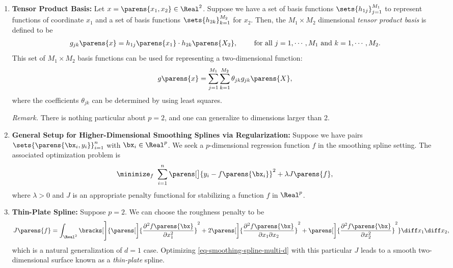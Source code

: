 \documentclass[12pt]{article}
\begin{document}
\begin{enumerate}[label=\textbf{\arabic*.}]

	\item \textbf{Tensor Product Basis:} Let $x = \parens{x_1, x_2} \in \Real^2$. Suppose we have a set of basis functions $\sets{h_{1j}}_{j = 1}^{M_1}$ to represent functions of coordinate $x_1$ and a set of basis functions $\sets{h_{2k}}_{k = 1}^{M_2}$ for $x_2$. Then, the $M_1 \times M_2$ dimensional \textit{tensor product basis} is defined to be 
	\begin{align*}
		g_{jk} \parens{x} = h_{1j} \parens{x_1} \cdot h_{2k} \parens{X_2}, \qquad \text{ for all } j = 1, \cdots, M_1 \text{ and } k = 1, \cdots, M_2. 
	\end{align*}
	This set of $M_1 \times M_2$ basis functions can be used for representing a two-dimensional function: 
	\begin{align*}
		g \parens{x} = \sum_{j=1}^{M_1} \sum_{k=1}^{M_2} \theta_{jk} g_{jk} \parens{X}, 
	\end{align*}
	where the coefficients $\theta_{jk}$ can be determined by using least squares. 
	
	\textit{Remark.} There is nothing particular about $p = 2$, and one can generalize to dimensions larger than 2. 
	
	\item \textbf{General Setup for Higher-Dimensional Smoothing Splines via Regularization:} Suppose we have pairs $\sets{\parens{\bx_i, y_i}}_{i=1}^n$ with $\bx_i \in \Real^p$. We seek a $p$-dimensional regression function $f$ in the smoothing spline setting. The associated optimization problem is 
	\begin{align}\label{eq-smoothing-spline-multi-d}
		\minimize_f \ \sum_{i=1}^n \parens[\big]{y_i - f \parens{\bx_i} }^2 + \lambda J \parens{f}, 
	\end{align}
	where $\lambda > 0$ and $J$ is an appropriate penalty functional for stabilizing a function $f$ in $\Real^p$. 
	
	\item \textbf{Thin-Plate Spline:} Suppose $p = 2$. We can choose the roughness penalty to be 
	\begin{align}\label{eq-thin}
		J \parens{f} = \int_{\Real^2} \bracks[\Bigg]{ \parens[\bigg]{\frac{\partial^2 f \parens{\bx} }{\partial x_1^2}}^2 + 2 \parens[\bigg]{\frac{\partial^2 f \parens{\bx} }{\partial x_1 \partial x_2}}^2 + \parens[\bigg]{\frac{\partial^2 f \parens{\bx}}{\partial x_2^2}}^2} \diff x_1 \diff x_2, 
	\end{align}
	which is a natural generalization of $d = 1$ case. Optimizing \eqref{eq-smoothing-spline-multi-d} with this particular $J$ leads to a smooth two-dimensional surface known as a \textit{thin-plate} spline. 
	

\end{enumerate}
\end{document}

